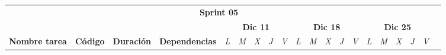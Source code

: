     \begin{table}[H]
        \centering
        \begin{tabular}{|llcllllllllllllllll|l}
        \cline{1-19}
        \multicolumn{19}{|c|}{\cellcolor[HTML]{8EA9D8}\textbf{Sprint 05}}                                                                                                                                                                                                                                                                                                                                                                                                                                                                                                                                                                                                                                                                                                                                                           &  \\ \cline{1-19}
        \multicolumn{1}{|c|}{}                                                                                 & \multicolumn{1}{c|}{}                                  & \multicolumn{1}{c|}{}                                    & \multicolumn{1}{c|}{}                                                   & \multicolumn{5}{c|}{\textbf{Dic 11}}                                                                                                                                    & \multicolumn{5}{c|}{\textbf{Dic 18}}                                                                                                                                    & \multicolumn{5}{c|}{\textbf{Dic 25}}                                                                                                                             &  \\ \cline{5-19}
        \multicolumn{1}{|c|}{\multirow{-2}{*}{\textbf{Nombre tarea}}}                                          & \multicolumn{1}{c|}{\multirow{-2}{*}{\textbf{Código}}} & \multicolumn{1}{c|}{\multirow{-2}{*}{\textbf{Duración}}} & \multicolumn{1}{c|}{\multirow{-2}{*}{\textbf{Dependencias}}}            & \multicolumn{1}{l|}{\textit{L}} & \multicolumn{1}{l|}{\textit{M}} & \multicolumn{1}{l|}{\textit{X}} & \multicolumn{1}{l|}{\textit{J}} & \multicolumn{1}{l|}{\textit{V}} & \multicolumn{1}{l|}{\textit{L}} & \multicolumn{1}{l|}{\textit{M}} & \multicolumn{1}{l|}{\textit{X}} & \multicolumn{1}{l|}{\textit{J}} & \multicolumn{1}{l|}{\textit{V}} & \multicolumn{1}{l|}{\textit{L}} & \multicolumn{1}{l|}{\textit{M}} & \multicolumn{1}{l|}{\textit{X}} & \multicolumn{1}{l|}{\textit{J}} & \textit{V}               &  \\ \cline{1-19}

\end{tabular}
\end{table}
